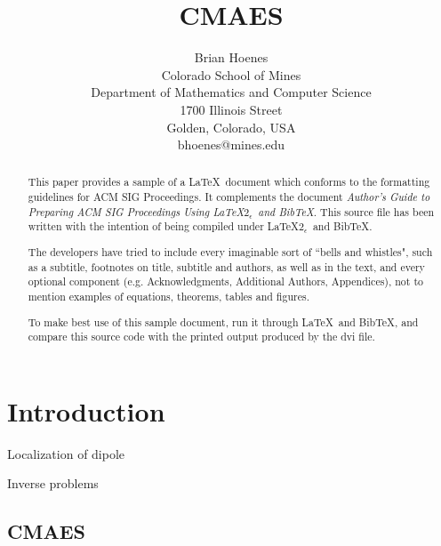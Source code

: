 \documentclass[twocolumn, balance]{article}
\begin{document}
\title{CMAES}

\author{Brian Hoenes\\
    Colorado School of Mines\\
	Department of Mathematics and Computer Science\\
	1700 Illinois Street\\
    Golden, Colorado, USA\\
	bhoenes@mines.edu}

\maketitle
\begin{abstract}
This paper provides a sample of a \LaTeX\ document which conforms to
the formatting guidelines for ACM SIG Proceedings.
It complements the document \textit{Author's Guide to Preparing
ACM SIG Proceedings Using \LaTeX$2_\epsilon$\ and Bib\TeX}. This
source file has been written with the intention of being
compiled under \LaTeX$2_\epsilon$\ and BibTeX.

The developers have tried to include every imaginable sort
of ``bells and whistles", such as a subtitle, footnotes on
title, subtitle and authors, as well as in the text, and
every optional component (e.g. Acknowledgments, Additional
Authors, Appendices), not to mention examples of
equations, theorems, tables and figures.

To make best use of this sample document, run it through \LaTeX\
and BibTeX, and compare this source code with the printed
output produced by the dvi file.
\end{abstract}

\section{Introduction}

Localization of dipole

Inverse problems

\subsection{CMAES} 
\end{document}
